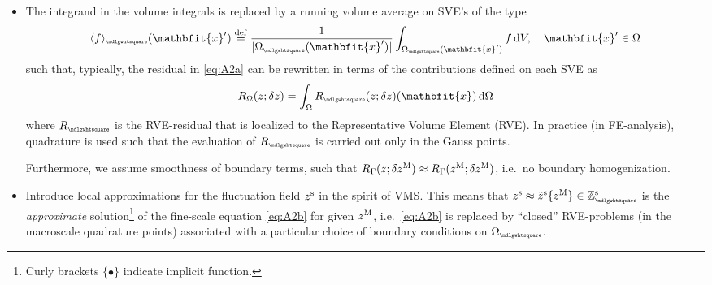 \documentclass[12pt,a4paper]{article}
\renewcommand{\ta}[1]{\mathbfit{#1}}
\renewcommand{\Box}{\mdlgwhtsquare}
\DeclarePairedDelimiter{\homgen}{\langle}{\rangle_\rve}
\newcommand{\rve}{
  {\mathchoice
   {\mbox{\scalebox{0.67}{$\Box$}}}
   {\mbox{\scalebox{0.67}{$\Box$}}}
   {\mbox{\scalebox{0.5}{$\Box$}}}
   {\mbox{\scalebox{0.375}{$\Box$}}}
  }
}
\begin{document}
\begin{itemize}
\item The integrand in the volume integrals is replaced by a running volume average on SVE's of the type
\begin{equation}
    \homgen{f}(\ta{x}') \defeq \frac{1}{|\Omega_\rve(\ta{x}')|} \int_{\Omega_\rve(\ta{x}')} f \dif V, \quad \ta{x}'\in\Omega
\label{eq:A105}
\end{equation}
such that, typically, the residual in \eqref{eq:A2a} can be rewritten in terms of the contributions defined on each SVE as
\begin{align}
\label{eq:A106} R_\Omega(z;\delta z) = \int_\Omega R_\rve(z;\delta z)(\bar{\ta x})\dif\Omega
\end{align}
where $R_\rve$ is the RVE-residual that is localized to the Representative Volume Element (RVE).
In practice (in FE-analysis), quadrature is used such that the evaluation of $R_\rve$ is carried out only in the Gauss points.

Furthermore, we assume smoothness of boundary terms, such that $R_\Gamma(z; \delta z^{\mathrm{M}}) \approx R_\Gamma(z^{\mathrm{M}};\delta z^{\mathrm{M}})$, i.e.\ no boundary homogenization.

\item Introduce local approximations for the fluctuation field $z^{\mathrm{s}}$ in the spirit of VMS.
This means that $z^\fluct \approx \tilde{z}^\fluct\{z^\macro\}\in\set{Z}_\rve^{\fluct}$ is the \emph{approximate} solution\footnote{Curly brackets $\{\bullet\}$ indicate implicit function.} of the fine-scale 
equation \eqref{eq:A2b} for given $z^{\mathrm{M}}$, i.e.\ \eqref{eq:A2b} is replaced by ``closed'' RVE-problems (in the macroscale quadrature points) associated with a particular choice of boundary conditions on $\Omega_\rve$.
\end{itemize}
\end{document}
